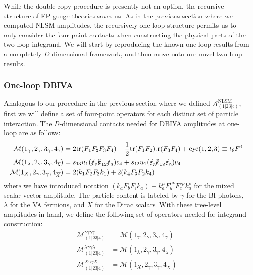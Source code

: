 \documentclass[12pt,letter]{article}
\begin{document}
While the double-copy procedure is presently not an option, the recursive structure of EP gauge theories saves us. As in the previous section where we computed NLSM amplitudes, the recursively one-loop structure permits us to only consider the four-point contacts when constructing the physical parts of the two-loop integrand. We will start by reproducing the known one-loop results from a completely $D$-dimensional framework, and then move onto our novel two-loop results. 

\subsubsection{One-loop DBIVA}\label{sec:1loopDBIU}
Analogous to our procedure in the previous section where we defined $\mathcal{A}^{\text{NLSM}}_{(1|23|4)}$, first we will define a set of four-point operators for each distinct set of particle interaction. The $D$-dimensional contacts needed for DBIVA amplitudes at one-loop are as follows:
\begin{align}
\mathcal{M}(1_\gamma,2_\gamma,3_\gamma,4_\gamma) &= 2\text{tr}(F_1F_2F_3F_4) - \frac{1}{2}\text{tr}(F_1F_2)\text{tr}(F_3F_4)+\text{cyc}(1,2,3) \equiv t_8 F^4
\\
\mathcal{M}(1_\lambda,2_\gamma,3_\gamma,4_{\overline{\lambda}}) &= s_{13}\bar{u}_1(\slashed{\varepsilon}_2\slashed{k}_{12}\slashed{\varepsilon}_3) \bar{v}_4 + s_{12}\bar{u}_1(\slashed{\varepsilon}_3\slashed{k}_{13}\slashed{\varepsilon}_2) \bar{v}_4
\\
\mathcal{M}(1_X,2_\gamma,3_\gamma,4_{\overline{X}}) &= 2 (k_1 F_2 F_3 k_1) +2 (k_4 F_3 F_2 k_4)
\end{align}
where we have introduced notation $(k_a F_b F_c k_a) \equiv k_a^\mu F^{\mu\nu}_bF^{\nu\rho}_c k_a^\rho$ for the mixed scalar-vector amplitude. The particle content is labeled by $\gamma$ for the BI photons, $\lambda$ for the VA fermions, and $X$ for the Dirac scalars. With these tree-level amplitudes in hand, we define the following set of operators needed for integrand construction:
\begin{align}
\mathcal{M}^{\gamma \gamma \gamma \gamma }_{(1|23|4)} &= \mathcal{M}(1_\gamma,2_\gamma,3_\gamma,4_\gamma)   
\\
\mathcal{M}^{\lambda \gamma \gamma \bar{\lambda} }_{(1|23|4)} &= \mathcal{M}(1_\lambda,2_\gamma,3_\gamma,4_{\overline{\lambda}})
\\
\mathcal{M}^{X \gamma \gamma \bar{X} }_{(1|23|4)} &= \mathcal{M}(1_X,2_\gamma,3_\gamma,4_{\overline{X}}) 
\end{align}
\end{document}
